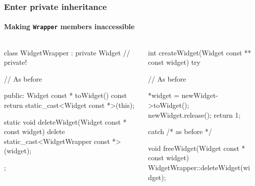 \documentclass{beamer}
\def\code#1{\texttt{#1}}
\begin{document}
\begin{frame}[fragile]
\frametitle{Enter private inheritance}
\framesubtitle{Making \code{Wrapper} members inaccessible}
\begin{columns}
\begin{column}{0.45\textwidth}
\begin{TinyC++}
class WidgetWrapper : private Widget // private!
{
	// As before

public:	
	Widget const * toWidget() const
	{
		return static_cast<Widget const *>(this);
	}
	
	static void deleteWidget(Widget const * const widget)
	{
		delete static_cast<WidgetWrapper const *>(widget);
	}
};
\end{TinyC++}
\end{column}
\pause
\begin{column}{0.45\textwidth}
\begin{TinyC++}
int createWidget(Widget const ** const widget)
try
{
	// As before
    
	*widget = newWidget->toWidget();
	newWidget.release();
	return 1;
}
catch /* as before */
\end{TinyC++}

\begin{TinyC++}
void freeWidget(Widget const * const widget)
{
	WidgetWrapper::deleteWidget(widget);
}
\end{TinyC++}
\end{column}
\end{columns}
\end{frame}

\end{document}
